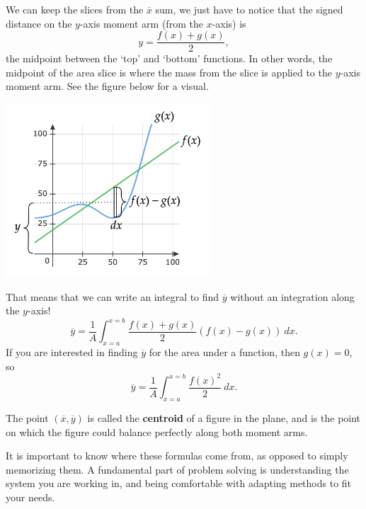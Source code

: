 We can keep the slices from the $\overline{x}$ sum, we just have to notice that the signed distance on the $y$-axis moment arm (from the $x$-axis) is
$$y=\frac{f(x)+g(x)}{2},$$
the midpoint between the `top' and `bottom' functions. In other words, the midpoint of the area slice is where the mass from the slice is applied to the $y$-axis moment arm. See the figure below for a visual.

\begin{center}
\includegraphics[width=3in]{img/moments_plot3.png}
\end{center}

That means that we can write an integral to find $\overline{y}$ without an integration along the $y$-axis!
$$
\overline{y}=\frac{1}{A}\int_{x=a}^{x=b}\frac{f(x)+g(x)}{2}(f(x)-g(x))\ dx.
$$
If you are interested in finding $\overline{y}$ for the area under a function, then $g(x)=0$, so
$$
\overline{y} = \frac{1}{A}\int_{x=a}^{x=b}\frac{f(x)^2}{2}\ dx.
$$

The point $(\overline{x},\overline{y})$ is called the \textbf{centroid} of a figure in the plane, and is the point on which the figure could balance perfectly along both moment arms.

It is important to know where these formulas come from, as opposed to simply memorizing them. A fundamental part of problem solving is understanding the system you are working in, and being comfortable with adapting methods to fit your needs.

